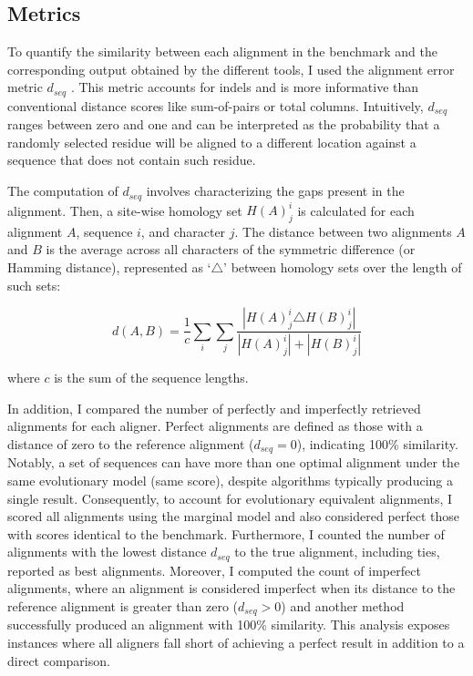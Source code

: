 \subsection*{Metrics}

To quantify the similarity between each alignment in the benchmark and the corresponding output obtained by the different tools, I used the alignment error metric $d_{seq}$ \citep{metrics_blackburne_whelan_2011}. This metric accounts for indels and is more informative than conventional distance scores like sum-of-pairs or total columns. Intuitively, $d_{seq}$ ranges between zero and one and can be interpreted as the probability that a randomly selected residue will be aligned to a different location against a sequence that does not contain such residue.

The computation of $d_{seq}$ involves characterizing the gaps present in the alignment. Then, a site-wise homology set $H(A)^i_j$ is calculated for each alignment $A$, sequence $i$, and character $j$. The distance between two alignments $A$ and $B$ is the average across all characters of the symmetric difference (or Hamming distance), represented as `$\triangle$' between homology sets over the length of such sets:

\begin{equation}
d(A,B) = \frac{1}{c} \sum_i \sum_j \frac{|H(A)^i_j \triangle H(B)^i_j|}{|H(A)^i_j|+|H(B)^i_j|}
\end{equation}

\noindent where $c$ is the sum of the sequence lengths.

In addition, I compared the number of perfectly and imperfectly retrieved alignments for each aligner. Perfect alignments are defined as those with a distance of zero to the reference alignment ($d_{seq} = 0$), indicating 100\% similarity. Notably, a set of sequences can have more than one optimal alignment under the same evolutionary model (same score), despite algorithms typically producing a single result. Consequently, to account for evolutionary equivalent alignments, I scored all alignments using the marginal model and also considered perfect those with scores identical to the benchmark.
Furthermore, I counted the number of alignments with the lowest distance $d_{seq}$ to the true alignment, including ties, reported as best alignments. Moreover, I computed the count of imperfect alignments, where an alignment is considered imperfect when its distance to the reference alignment is greater than zero ($d_{seq} > 0$) and another method successfully produced an alignment with 100\% similarity. This analysis exposes instances where all aligners fall short of achieving a perfect result in addition to a direct comparison.

